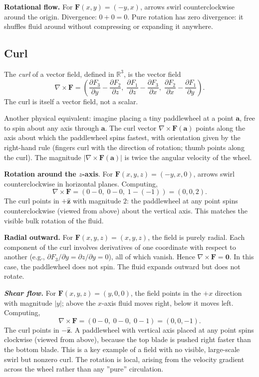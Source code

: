 \documentclass{article}
\begin{document}
\textbf{Rotational flow. }For $\mathbf{F}(x, y) = (-y, x)$, arrows swirl counterclockwise around the origin. Divergence: $0 + 0 = 0$. Pure rotation has zero divergence: it shuffles fluid around without compressing or expanding it anywhere.
 
\subsection{Curl}
 
The \textit{curl} of a vector field, defined in $\mathbb{R}^3$, is the vector field
$$\nabla \times \mathbf{F} = \left(\frac{\partial F_3}{\partial y} - \frac{\partial F_2}{\partial z},\; \frac{\partial F_1}{\partial z} - \frac{\partial F_3}{\partial x},\; \frac{\partial F_2}{\partial x} - \frac{\partial F_1}{\partial y}\right).$$
The curl is itself a vector field, not a scalar.
 
Another physical equivalent: imagine placing a tiny paddlewheel at a point $\mathbf{a}$, free to spin about any axis through $\mathbf{a}$. The curl vector $\nabla \times \mathbf{F}(\mathbf{a})$ points along the axis about which the paddlewheel spins fastest, with orientation given by the right-hand rule (fingers curl with the direction of rotation; thumb points along the curl). The magnitude $|\nabla \times \mathbf{F}(\mathbf{a})|$ is twice the angular velocity of the wheel.
 
\textbf{Rotation around the $z$-axis}. For $\mathbf{F}(x, y, z) = (-y, x, 0)$, arrows swirl counterclockwise in horizontal planes. Computing,
$$\nabla \times \mathbf{F} = (0 - 0,\; 0 - 0,\; 1 - (-1)) = (0, 0, 2).$$
The curl points in $+\hat{\mathbf{z}}$ with magnitude $2$: the paddlewheel at any point spins counterclockwise (viewed from above) about the vertical axis. This matches the visible bulk rotation of the fluid.
 
\textbf{Radial outward.} For $\mathbf{F}(x, y, z) = (x, y, z)$, the field is purely radial. Each component of the curl involves derivatives of one coordinate with respect to another (e.g., $\partial F_3 / \partial y = \partial z / \partial y = 0$), all of which vanish. Hence $\nabla \times \mathbf{F} = \mathbf{0}$. In this case, the paddlewheel does not spin. The fluid expands outward but does not rotate.
 
\textbf{\textit{Shear flow.} }For $\mathbf{F}(x, y, z) = (y, 0, 0)$, the field points in the $+x$ direction with magnitude $|y|$; above the $x$-axis fluid moves right, below it moves left. Computing,
$$\nabla \times \mathbf{F} = (0 - 0,\; 0 - 0,\; 0 - 1) = (0, 0, -1).$$
The curl points in $-\hat{\mathbf{z}}$. A paddlewheel with vertical axis placed at any point spins clockwise (viewed from above), because the top blade is pushed right faster than the bottom blade. This is a key example of a field with no visible, large-scale swirl but nonzero curl. The rotation is local, arising from the velocity gradient across the wheel rather than any ''pure'' circulation.
 
\end{document}
